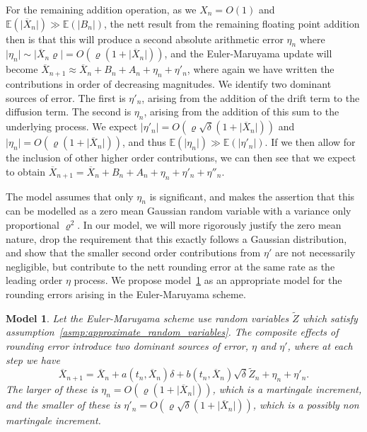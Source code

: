 \documentclass[9pt,a4paper,english]{extarticle}
\newtheorem{model}{Model}[section]
\begin{document}
For the remaining addition operation, as we $ X_n = O(1) $ and $ \mathbb{E}(\lvert \overline{X}_n \rvert)  \gg \mathbb{E}(\lvert B_n \rvert)  $, the nett result from the remaining floating point addition then is that this will produce a second absolute arithmetic error $ \eta_n $ where $ \lvert \eta_n \rvert  \sim \lvert  \overline{X}_n \varrho \rvert = O(\varrho (1 + \lvert \overline{X}_n\rvert ))$, and the Euler-Maruyama update will become
$ \overline{X}_{n+1} \approx \overline{X}_n + B_n + A_n + \eta_n + \eta'_n $, 
where again we have written the contributions in order of decreasing magnitudes. We identify two dominant sources of error. The first is $ \eta'_n $, arising from the addition of the drift term to the diffusion term. The second is $ \eta_n $, arising from the addition of this sum to the underlying process.  We expect $ \lvert \eta'_n\rvert  = O(\varrho\sqrt{\delta} (1 + \lvert \overline{X}_n\rvert ))$ and $ \lvert \eta_n\rvert = O(\varrho (1 + \lvert \overline{X}_n\rvert ))$, and thus $ \mathbb{E}(\lvert \eta_n\rvert)  \gg \mathbb{E}(\lvert \eta'_n\rvert ) $.  If we then allow for the inclusion of other higher order contributions, we can then see that we expect to obtain
$ \overline{X}_{n+1} = \overline{X}_n + B_n + A_n + \eta_n + \eta'_n + \eta''_n $.

The \citet{arciniega2003rounding} model assumes that only $ \eta_n $ is significant, and makes the assertion that this can be modelled as a zero mean Gaussian random variable with a variance only proportional $ \varrho^2 $. In our model, we will more rigorously justify the zero mean nature, drop the requirement that this exactly follows a Gaussian distribution, and show that the smaller second order contributions from $ \eta' $ are not necessarily negligible, but contribute to the nett rounding error at the same rate as the leading order $ \eta $ process. We propose model~\ref{model:rounding_errors} as an appropriate model for the rounding errors arising in the Euler-Maruyama scheme.  

\begin{model}
\label{model:rounding_errors}
Let the Euler-Maruyama scheme use random variables $ \widetilde{Z} $ which satisfy assumption~\ref{asmp:approximate_random_variables}. The composite effects of rounding error introduce two dominant sources of error, $ \eta $ and $ \eta' $, where at each step we have 
\begin{equation*}
\overline{X}_{n+1} = \overline{X}_n + a(t_n, \overline{X}_n) \delta +  b(t_n, \overline{X}_n) \sqrt{\delta} \widetilde{Z}_n + \eta_n + \eta'_n.
\end{equation*}
The larger of these is $ \eta_n = O(\varrho (1 + \lvert\overline{X}_n\rvert)) $, which is a martingale increment, and the smaller of these  is $ \eta'_n = O(\varrho\sqrt{\delta} (1 + \lvert \overline{X}_n\rvert)) $, which is a possibly non martingale increment.
\end{model}
\end{document}
